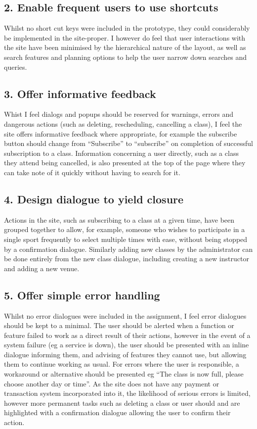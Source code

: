 \documentclass[10pt]{article}
\begin{document}
      \subsection{2. Enable frequent users to use shortcuts}
        Whilst no short cut keys were included in the prototype, they could considerably be implemented in the site-proper. I however do feel that user interactions with the site have been minimised by the hierarchical nature of the layout, as well as search features and planning options to help the user narrow down searches and queries. 

      \subsection{3. Offer informative feedback}
        Whist I feel dialogs and popups should be reserved for warnings, errors and dangerous actions (such as deleting, rescheduling, cancelling a class), I feel the site offers informative feedback where appropriate, for example the subscribe button should change from ``Subscribe'' to ``subscribe'' on completion of successful subscription to a class. Information concerning a user directly, such as a class they attend being cancelled, is also presented at the top of the page where they can take note of it quickly without having to search for it. 

      \subsection{4. Design dialogue to yield closure}
        Actions in the site, such as subscribing to a class at a given time, have been grouped together to allow, for example, someone who wishes to participate in a single sport frequently to select multiple times with ease, without being stopped by a confirmation dialogue. Similarly adding new classes by the administrator can be done entirely from the new class dialogue, including creating a new instructor and adding a new venue.

      \subsection{5. Offer simple error handling}
        Whilst no error dialogues were included in the assignment, I feel error dialogues should be kept to a minimal. The user should be alerted when a function or feature failed to work as a direct result of their actions, however in the event of a system failure (eg a service is down), the user should be presented with an inline dialogue informing them, and advising of features they cannot use, but allowing them to continue working as usual. For errors where the user is responsible, a workaround or alternative should be presented eg ``The class is now full, please choose another day or time''. As the site does not have any payment or transaction system incorporated into it, the likelihood of serious errors is limited, however more permanent tasks such as deleting a class or user should and are highlighted with a confirmation dialogue allowing the user to confirm their action.
\end{document}
